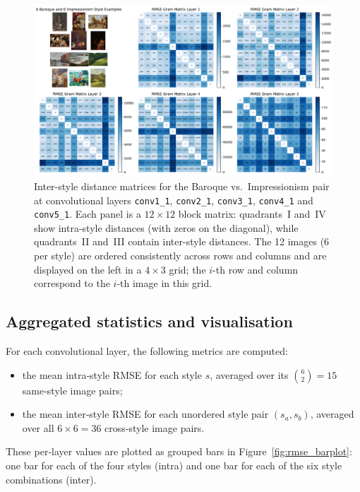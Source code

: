 \documentclass[a4paper,11pt]{article}
\begin{document}
\begin{figure}[ht]
  \centering
  \includegraphics[width=\textwidth]{../figures/Baroque_Impressionism_RMSE.png}
  \caption{Inter-style distance matrices for the Baroque vs.\ Impressionism pair at convolutional layers \texttt{conv1\_1}, \texttt{conv2\_1}, \texttt{conv3\_1}, \texttt{conv4\_1} and \texttt{conv5\_1}. Each panel is a \(12\times12\) block matrix: quadrants~I and~IV show intra-style distances (with zeros on the diagonal), while quadrants~II and~III contain inter-style distances. The 12 images (6 per style) are ordered consistently across rows and columns and are displayed on the left in a $4\times3$ grid; the $i$-th row and column correspond to the $i$-th image in this grid.}
  \label{fig:rmse_inter}
\end{figure}

\subsection{Aggregated statistics and visualisation}
For each convolutional layer, the following metrics are computed:
\begin{itemize}
    \item the mean intra‐style RMSE for each style \(s\), averaged over its \(\binom{6}{2}=15\) same‐style image pairs;
    \item the mean inter‐style RMSE for each unordered style pair \((s_a,s_b)\), averaged over all \(6\times6=36\) cross‐style image pairs.
\end{itemize}
These per‐layer values are plotted as grouped bars in Figure~\ref{fig:rmse_barplot}: one bar for each of the four styles (intra) and one bar for each of the six style combinations (inter).
\end{document}
